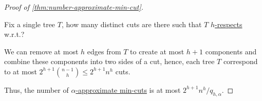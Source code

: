 \begin{proof}[Proof of \autoref{thm:number-approximate-min-cut}]
	\begin{problem*}
		Fix a single tree \(T\), how many distinct cuts are there such that \(T\) \hyperref[def:respect]{\(h\)-respects} w.r.t.?
	\end{problem*}
	\begin{answer}
		We can remove at most \(h\) edges from \(T\) to create at most \(h + 1\) components and combine these components into two sides of a cut, hence, each tree \(T\) correspond to at most \(2^{h+1} \binom{n-1}{h} \leq 2^{h+1} n^h\) cuts.
	\end{answer}

	Thus, the number of \hyperref[def:approximate-min-cut]{\(\alpha \)-approximate min-cuts} is at most \(2^{h+1} n^h / q_{h, \alpha }\).
\end{proof}